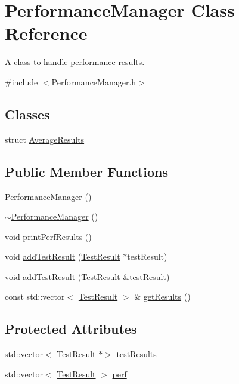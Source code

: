 \hypertarget{class_performance_manager}{}\section{Performance\+Manager Class Reference}
\label{class_performance_manager}


A class to handle performance results.  




{\ttfamily \#include $<$Performance\+Manager.\+h$>$}

\subsection*{Classes}
\begin{DoxyCompactItemize}
\item 
struct \hyperlink{struct_performance_manager_1_1_average_results}{Average\+Results}
\end{DoxyCompactItemize}
\subsection*{Public Member Functions}
\begin{DoxyCompactItemize}
\item 
\hyperlink{class_performance_manager_ab9e6bcde7a6a29b4b791300805e3774d}{Performance\+Manager} ()
\item 
\hyperlink{class_performance_manager_a4cdbf108ea6a7cdad618144c3c7a287c}{$\sim$\+Performance\+Manager} ()
\item 
void \hyperlink{class_performance_manager_a51d37a97f0ef246c5e5e5b6c2bbefc23}{print\+Perf\+Results} ()
\item 
void \hyperlink{class_performance_manager_a35c9c4d3c52d3580a56a684196393dd5}{add\+Test\+Result} (\hyperlink{class_test_result}{Test\+Result} $\ast$test\+Result)
\item 
void \hyperlink{class_performance_manager_a732f26520dd9d6216b7ac80160bc5db3}{add\+Test\+Result} (\hyperlink{class_test_result}{Test\+Result} \&test\+Result)
\item 
const std\+::vector$<$ \hyperlink{class_test_result}{Test\+Result} $>$ \& \hyperlink{class_performance_manager_aca3998b3ce95df432df3b72eda3f639e}{get\+Results} ()
\end{DoxyCompactItemize}
\subsection*{Protected Attributes}
\begin{DoxyCompactItemize}
\item 
std\+::vector$<$ \hyperlink{class_test_result}{Test\+Result} $\ast$$>$ \hyperlink{class_performance_manager_ad456304b0437d5dac639f622f33dbabe}{test\+Results}
\item 
std\+::vector$<$ \hyperlink{class_test_result}{Test\+Result} $>$ \hyperlink{class_performance_manager_ad71f956546a14c54a6a6122f0b857b9d}{perf}
\end{DoxyCompactItemize}


